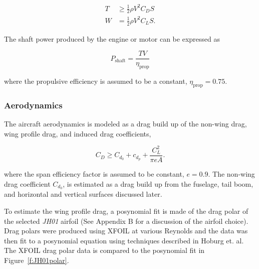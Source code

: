 \begin{align}
    \label{e:slfthrust}
    T &\geq \frac{1}{2} \rho V^2 C_D S\\
    \label{e:slfweight}
    W &= \frac{1}{2} \rho V^2 C_L S. 
\end{align}

The shaft power produced by the engine or motor can be expressed as  

\begin{equation}
    \label{e:slfpower}
    P_{\text{shaft}} = \frac{TV}{\eta_{\text{prop}}}
    \end{equation}

    where the propulsive efficiency is assumed to be a constant, $\eta_{\text{prop}} = 0.75$. 

\subsubsection{Aerodynamics}

The aircraft aerodynamics is modeled as a drag build up of the non-wing drag, wing profile drag, and induced drag coefficients, 

\begin{equation}
    \label{e:aerodragb}
    C_D \geq C_{d_0} + c_{d_p} + \frac{C_L^2}{\pi e A}.
    \end{equation}

where the span efficiency factor is assumed to be constant, $e=0.9$. 
The non-wing drag coefficient $C_{d_0}$, is estimated as a drag build up from the fuselage, tail boom, and horizontal and vertical surfaces discussed later.
    
    To estimate the wing profile drag, a posynomial fit is made of the drag polar of the selected \emph{JH01} airfoil (See Appendix B for a discussion of the airfoil choice). 
    Drag polars were produced using XFOIL\cite{xfoil} at various Reynolds and the data was then fit to a posynomial equation using techniques described in Hoburg et. al.\cite{fitting}
    The XFOIL drag polar data is compared to the posynomial fit in Figure~\ref{f:JH01polar}.


